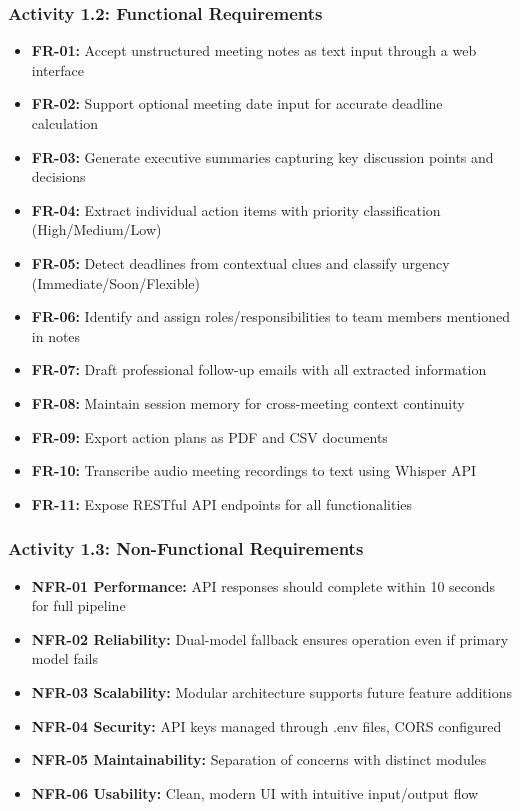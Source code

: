 \documentclass[12pt,a4paper]{article}
\begin{document}
\subsubsection{Activity 1.2: Functional Requirements}
\begin{itemize}
  \item \textbf{FR-01:} Accept unstructured meeting notes as text input through a web interface
  \item \textbf{FR-02:} Support optional meeting date input for accurate deadline calculation
  \item \textbf{FR-03:} Generate executive summaries capturing key discussion points and decisions
  \item \textbf{FR-04:} Extract individual action items with priority classification (High/Medium/Low)
  \item \textbf{FR-05:} Detect deadlines from contextual clues and classify urgency (Immediate/Soon/Flexible)
  \item \textbf{FR-06:} Identify and assign roles/responsibilities to team members mentioned in notes
  \item \textbf{FR-07:} Draft professional follow-up emails with all extracted information
  \item \textbf{FR-08:} Maintain session memory for cross-meeting context continuity
  \item \textbf{FR-09:} Export action plans as PDF and CSV documents
  \item \textbf{FR-10:} Transcribe audio meeting recordings to text using Whisper API
  \item \textbf{FR-11:} Expose RESTful API endpoints for all functionalities
\end{itemize}

\subsubsection{Activity 1.3: Non-Functional Requirements}
\begin{itemize}
  \item \textbf{NFR-01 Performance:} API responses should complete within 10 seconds for full pipeline
  \item \textbf{NFR-02 Reliability:} Dual-model fallback ensures operation even if primary model fails
  \item \textbf{NFR-03 Scalability:} Modular architecture supports future feature additions
  \item \textbf{NFR-04 Security:} API keys managed through .env files, CORS configured
  \item \textbf{NFR-05 Maintainability:} Separation of concerns with distinct modules
  \item \textbf{NFR-06 Usability:} Clean, modern UI with intuitive input/output flow
\end{itemize}
\end{document}
